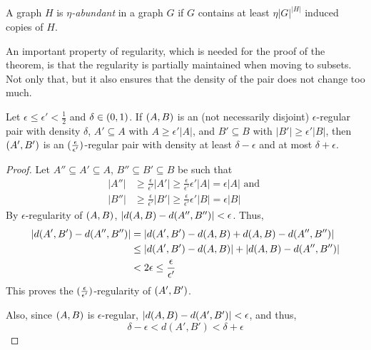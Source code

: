         \begin{definition} \label{def:abundant}
            A graph $H$ is \emph{$\eta$-abundant} in a graph $G$ if $G$ contains at least $\eta |G|^{|H|}$
            induced copies of $H$.
        \end{definition}

        An important property of regularity, which is needed for the proof of the theorem, is that the regularity is
        partially maintained when moving to subsets.
        Not only that, but it also ensures that the density of the pair does not change too much.

        \begin{lemma} \label{lem:regularity_is_transitive}
            Let $\epsilon \leq \epsilon' < \frac{1}{2}$ and $\delta \in ( 0, 1 )$.
            If $( A,B )$ is an (not necessarily disjoint) $\epsilon$-regular pair with density $\delta$, $A' \subseteq A$ with
            $A \geq \epsilon' |A|$, and $B' \subseteq B$ with $|B'| \geq \epsilon' |B|$, then $( A', B' )$ is an
            $( \frac{\epsilon}{\epsilon'} )$-regular pair with density at least $\delta - \epsilon$ and at most $\delta + \epsilon$.
            \begin{proof}
                Let $A'' \subseteq A' \subseteq A$, $B'' \subseteq B' \subseteq B$ be such that
                \begin{align*}
                    |A''| & \geq \frac{\epsilon}{\epsilon'} |A'| \geq \frac{\epsilon}{\epsilon'} \epsilon' |A| = \epsilon |A|
                    \text{ and } \\
                    |B''| & \geq \frac{\epsilon}{\epsilon'} |B'| \geq \frac{\epsilon}{\epsilon'} \epsilon' |B| = \epsilon |B|
                \end{align*}
                By $\epsilon$-regularity of $( A,B )$, $| d(A,B) - d(A'',B'') | < \epsilon$.
                Thus,
                \begin{align*}
                    | d(A',B') - d(A'',B'') |
                        & = | d(A',B') - d(A,B) + d(A,B) - d(A'',B'') | \\
                        & \leq | d(A',B') - d(A,B) | + | d(A,B) - d(A'',B'') | \\
                        & < 2 \epsilon \leq \frac{\epsilon}{\epsilon'}
                \end{align*}
                This proves the $( \frac{\epsilon}{\epsilon'} )$-regularity of $( A',B' )$.

                Also, since $( A,B )$ is $\epsilon$-regular, $| d(A,B) - d(A',B') | < \epsilon$,
                and thus,
                \[
                    \delta - \epsilon < d(A',B') < \delta + \epsilon
                \]
            \end{proof}
        \end{lemma}

